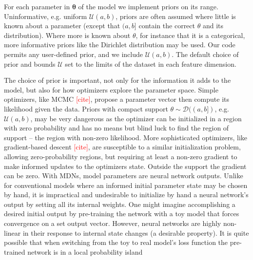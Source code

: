 \documentclass[twocolumn]{aastex631}
\newcommand{\mbs}[1]{\boldsymbol{#1}}
\newcommand{\mcal}[1]{\mathcal{#1}}
\newcommand{\TODO}[1]{{\textcolor{red}{#1}}}
\begin{document}
            For each parameter in $\mbs{\theta}$ of the model we implement
            priors on its range.  Uninformative, e.g. uniform $\mcal{U}(a, b)$,
            priors are often assumed where little is known about a parameter
            (except that $(a,b]$ contain the correct $\theta$ and its
            distribution). Where more is known about $\theta$, for instance that
            it is a categorical, more informative priors like the Dirichlet
            distribution \citep{Bishop_Christopher_M_2016-08-23} may be used.
            Our code permits any user-defined prior, and we include $\mcal{U}(a,
            b)$.  The default choice of prior and bounds $\mcal{U}$ set to the
            limits of the dataset in each feature dimension.

            The choice of prior is important, not only for the information it
            adds to the model, but also for how optimizers explore the parameter
            space. Simple optimizers, like MCMC \TODO{[cite]}, propose a
            parameter vector then compute its likelihood given the data. Priors
            with compact support  $\theta \sim \mcal{D}((a, b])$, e.g.
            $\mcal{U}(a, b)$, may be very dangerous as the optimizer can be
            initialized in a region with zero probability and has no means but
            blind luck to find the region of support -- the region with non-zero
            likelihood. More sophisticated optimizers, like gradient-based
            descent \TODO{[cite]}, are susceptible to a similar initialization
            problem, allowing zero-probability regions, but requiring at least a
            non-zero gradient to make informed updates to the optimizers state.
            Outside the  support the gradient can be zero.  With MDNs, model
            parameters are neural network outputs. Unlike for conventional
            models where an informed initial parameter state may be chosen by
            hand, it is impractical and undesirable to initialize by hand a
            neural network's output by setting all its internal weights. One
            might imagine accomplishing a desired initial output by pre-training
            the network with a toy model that forces convergence on a set output
            vector. However, neural networks are highly non-linear in their
            response to internal state changes (a desirable property). It is
            quite possible that when switching from the toy to real model's loss
            function the pre-trained network is in a local probability island
\end{document}
